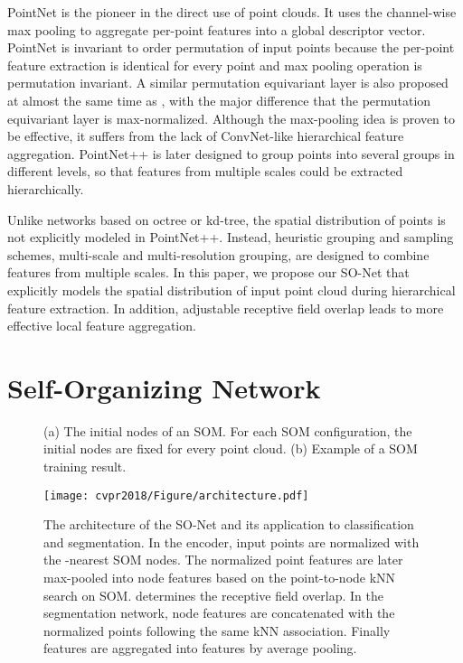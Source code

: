 \documentclass[10pt,twocolumn,letterpaper]{article}
\begin{document}
PointNet \cite{qi2016pointnet} is the pioneer in the direct use of point clouds. It uses the channel-wise max pooling to aggregate per-point features into a global descriptor vector. PointNet is invariant to order permutation of input points because the per-point feature extraction is identical for every point and max pooling operation is permutation invariant. A similar permutation equivariant layer \cite{ravanbakhsh2016deep} is also proposed at almost the same time as \cite{qi2016pointnet}, with the major difference that the permutation equivariant layer is max-normalized. Although the max-pooling idea is proven to be effective, it suffers from the lack of ConvNet-like hierarchical feature aggregation. PointNet++ \cite{qi2017pointnet++} is later designed to group points into several groups in different levels, so that features from multiple scales could be extracted hierarchically.

Unlike networks based on octree or kd-tree, the spatial distribution of points is not explicitly modeled in PointNet++. Instead, heuristic grouping and sampling schemes, \eg multi-scale and multi-resolution grouping, are designed to combine features from multiple scales. In this paper, we propose our SO-Net that explicitly models the spatial distribution of input point cloud during hierarchical feature extraction. In addition, adjustable receptive field overlap leads to more effective local feature aggregation.






\section{Self-Organizing Network}
\begin{figure}[t!]
        \centering
        \caption{(a) The initial nodes of an  SOM. For each SOM configuration, the initial nodes are fixed for every point cloud. (b) Example of a SOM training result.}
        \vspace{-4pt}
\end{figure}
\begin{figure*}[t!] \centering
\texttt{[image: cvpr2018/Figure/architecture.pdf]}
\caption{The architecture of the SO-Net and its application to classification and segmentation. In the encoder, input points are normalized with the -nearest SOM nodes. The normalized point features are later max-pooled into node features based on the point-to-node kNN search on SOM.  determines the receptive field overlap. In the segmentation network,  node features are concatenated with the  normalized points following the same kNN association. Finally  features are aggregated into  features by average pooling. }\label{fig_architecture}
\vspace{-4pt}
\end{figure*}
\end{document}
